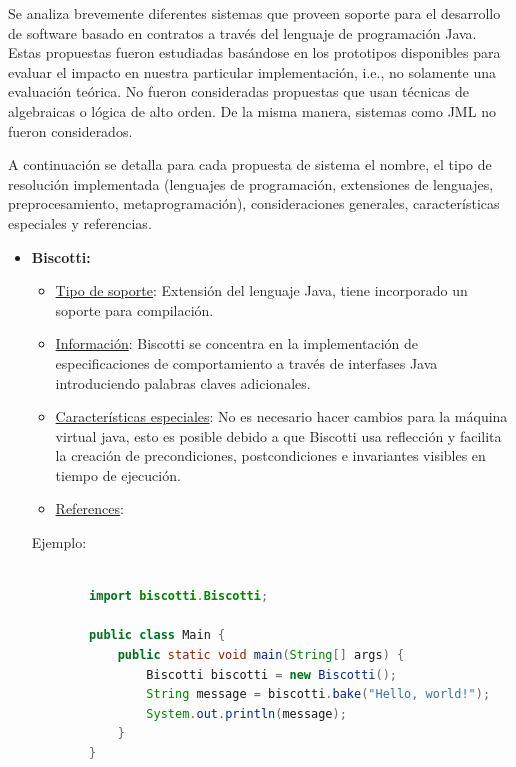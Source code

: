 Se analiza brevemente diferentes sistemas que proveen soporte para el desarrollo de software basado en contratos a través del lenguaje de programación Java. Estas propuestas fueron estudiadas basándose en los prototipos disponibles para evaluar el impacto en nuestra particular implementación, i.e., no solamente una evaluación teórica. No fueron consideradas propuestas que usan técnicas de algebraicas o lógica de alto orden. De la misma manera, sistemas como JML \cite{Leavens99} no fueron considerados. 

A continuación se detalla para cada propuesta de sistema el nombre, el tipo de resolución implementada (lenguajes de programación, extensiones de lenguajes, preprocesamiento, metaprogramación), consideraciones generales, características especiales y referencias.

\begin{itemize}

\item \textbf{Biscotti:}

\begin{itemize}
\item \underline{Tipo de soporte}: Extensión del lenguaje Java, tiene incorporado un soporte para compilación.
\item \underline{Información}: Biscotti se concentra en la implementación de especificaciones de comportamiento a través de interfases Java introduciendo palabras claves adicionales. 

\item \underline{Características especiales}: No es necesario hacer cambios para la máquina virtual java, esto es posible debido a que Biscotti usa reflección y facilita la creación de precondiciones, postcondiciones e invariantes visibles en tiempo de ejecución.

\item \underline{References}: \cite{Cicalese99}
\end{itemize}

Ejemplo: 

\begin{lstlisting}[language=Java]

        import biscotti.Biscotti;
        
        public class Main {
            public static void main(String[] args) {
                Biscotti biscotti = new Biscotti();
                String message = biscotti.bake("Hello, world!");
                System.out.println(message);
            }
        }
\end{lstlisting}




\end{itemize}
